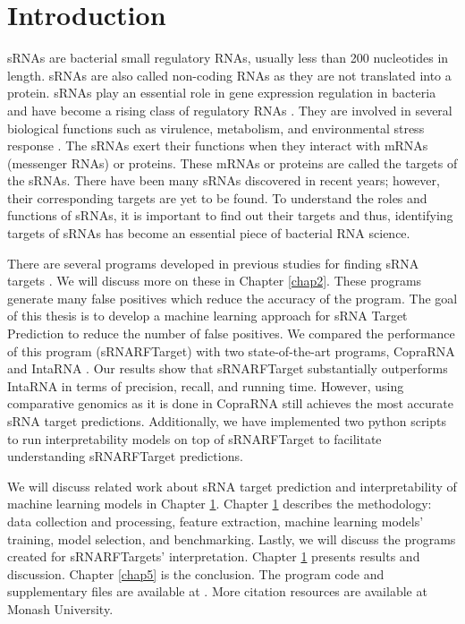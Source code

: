 \chapter{Introduction}
\label{chap1}

sRNAs are bacterial small regulatory RNAs, usually less than 200 nucleotides in length\cite{wiki:sRNA:2021}. sRNAs are also called non-coding RNAs as they are not translated into a protein. sRNAs play an essential role in gene expression regulation in bacteria and have become a rising class of regulatory RNAs \cite{WAGNER2015133}. They are involved in several biological functions such as virulence, metabolism, and environmental stress response \cite{WAGNER2015133}. The sRNAs exert their functions when they interact with mRNAs (messenger RNAs) or proteins. These mRNAs or proteins are called the targets of the sRNAs. There have been many sRNAs discovered in recent years; however, their corresponding targets are yet to be found. To understand the roles and functions of sRNAs, it is important to find out their targets and thus, identifying targets of sRNAs has become an essential piece of bacterial RNA science.

There are several programs developed in previous studies for finding sRNA targets \cite{Adrien2015}. We will discuss more on these in Chapter \ref{chap2}. These programs generate many false positives which reduce the accuracy of the program. The goal of this thesis is to develop a machine learning approach for sRNA Target Prediction to reduce the number of false positives. We compared the performance of this program (sRNARFTarget) with two state-of-the-art programs, CopraRNA \cite{Wright2013} and IntaRNA \cite{Richter2008}.  Our results show that sRNARFTarget substantially outperforms IntaRNA in terms of precision, recall, and running time. However, using comparative genomics as it is done in CopraRNA still achieves the most accurate sRNA target predictions. Additionally, we have implemented two python scripts to run interpretability models on top of sRNARFTarget to facilitate understanding sRNARFTarget predictions.

We will discuss related work about sRNA target prediction and interpretability of machine learning models in Chapter \ref{chap1}. Chapter \ref{chap1} describes the methodology: data collection and processing, feature extraction, machine learning models' training, model selection, and benchmarking. Lastly, we will discuss the programs created for sRNARFTargets' interpretation. Chapter \ref{chap1} presents results and discussion. Chapter \ref{chap5} is the conclusion. The program code and supplementary files are available at \cite{Haynes2013, wilcox}. More citation resources are available at Monash University\cite{monashCitations2021}.

